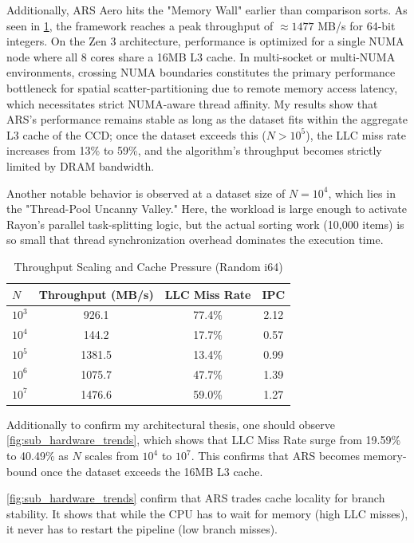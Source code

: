 Additionally, ARS Aero hits the "Memory Wall" earlier than comparison sorts. As seen in \cref{tab:throughput}, the framework reaches a peak throughput of $\approx 1477$ MB/s for 64-bit integers.
On the Zen 3 architecture, performance is optimized for a single NUMA node where all 8 cores share a 16MB L3 cache. In multi-socket or multi-NUMA environments, crossing NUMA boundaries constitutes the primary performance bottleneck for spatial scatter-partitioning due to remote memory access latency, which necessitates strict NUMA-aware thread affinity.
My results show that ARS's performance remains stable as long as the dataset fits within the aggregate L3 cache of the CCD; once the dataset exceeds this ($N > 10^5$), the LLC miss rate increases from 13\% to 59\%, and the algorithm's throughput becomes strictly limited by DRAM bandwidth.

Another notable behavior is observed at a dataset size of $N = 10^4$, which lies in the "Thread-Pool Uncanny Valley." Here, the workload is large enough to activate Rayon's parallel task-splitting logic, but the actual sorting work (10,000 items) is so small that thread synchronization overhead dominates the execution time.

\begin{table}[ht]
\caption{Throughput Scaling and Cache Pressure (Random i64)}
\label{tab:throughput}
\centering
\begin{tabular}{lccc}
\toprule
$N$ & Throughput (MB/s) & LLC Miss Rate & IPC \\
\midrule
$10^3$ & 926.1 & 77.4\% & 2.12 \\
$10^4$ & 144.2 & 17.7\% & 0.57 \\
$10^5$ & 1381.5 & 13.4\% & 0.99 \\
$10^6$ & 1075.7 & 47.7\% & 1.39 \\
$10^7$ & 1476.6 & 59.0\% & 1.27 \\
\bottomrule
\end{tabular}
\end{table}

Additionally to confirm my architectural thesis, one should observe \cref{fig:sub_hardware_trends}, which shows that LLC Miss Rate surge from 19.59\% to 40.49\% as $N$ scales from $10^4$ to $10^7$. This confirms that ARS becomes memory-bound once the dataset exceeds the 16MB L3 cache.

\cref{fig:sub_hardware_trends} confirm that ARS trades cache locality for branch stability.
It shows that while the CPU has to wait for memory (high LLC misses), it never has to restart the pipeline (low branch misses).


